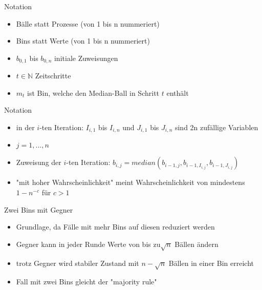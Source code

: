 \documentclass{beamer}
\begin{document}
    \begin{frame}{Notation}
        \begin{itemize}
            \item Bälle statt Prozesse (von 1 bis n nummeriert)
            \vfill
            \item Bins statt Werte (von 1 bis n nummeriert)
            \vfill
            \item \(b_{0,1}\) bis \(b_{0,n}\) initiale Zuweisungen
            \vfill
            \item \(t \in \mathbb{N}\) Zeitschritte
            \vfill
            \item \(m_t\) ist Bin, welche den Median-Ball in Schritt
                  \(t\) enthält
        \end{itemize}
    \end{frame}

    \begin{frame}{Notation}
        \begin{itemize}
            \item in der \(i\)-ten Iteration: \(I_{i,1}\) bis \(I_{i,n}\) und
                  \(J_{i,1}\) bis \(J_{i,n}\) sind 2n zufällige Variablen
            \vfill
            \item \(j = 1,...,n\)
            \vfill
            \item Zuweisung der \(i\)-ten Iteration:
                  \(b_{i,j} = median(b_{i-1,j}, b_{i-1,I_{i,j}}, b_{i-1,J_{i,j}})\)
            \vfill
            \item "mit hoher Wahrscheinlichkeit" meint Wahrscheinlichkeit von
                  mindestens \(1 - n^{-c}\) für \(c > 1\)
        \end{itemize}
    \end{frame}

    \begin{frame}{Zwei Bins mit Gegner}
        \begin{itemize}
            \item Grundlage, da Fälle mit mehr Bins auf diesen reduziert werden
            \vfill
            \item Gegner kann in jeder Runde Werte von bis zu\(\sqrt{n}\) Bällen
                  ändern
            \vfill
            \item trotz Gegner wird stabiler Zustand mit \(n - \sqrt{n}\) Bällen
                  in einer Bin erreicht
            \vfill
            \item Fall mit zwei Bins gleicht der "majority rule"
        \end{itemize}
    \end{frame}
\end{document}

